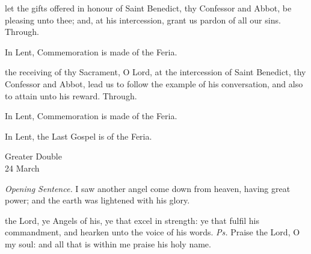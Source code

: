 \secret
{} let the gifts offered in honour of Saint Benedict, thy Confessor and Abbot, be pleasing unto thee; and, at his intercession, grant us pardon of all our sins. Through.
\begin{rubric}
    In Lent, Commemoration is made of the Feria.
\end{rubric}
\postcommunion
{} the receiving of thy Sacrament, O Lord, at the intercession of Saint Benedict, thy Confessor and Abbot, lead us to follow the example of his conversation, and also to attain unto his reward. Through.
\begin{rubric}
    In Lent, Commemoration is made of the Feria.
\end{rubric}
\begin{rubric}
    In Lent, the Last Gospel is of the Feria.
\end{rubric}

\clearpage
{}
\begin{inhead}
    {Greater Double\\
24 March}
\end{inhead}
\par\noindent
\textit{Opening Sentence.} I saw another angel come down from heaven, having great power; and the earth was lightened with his glory.
\par\noindent
{}
\par\noindent
{}
\par\noindent
{}

\introit
{} the Lord, ye Angels of his, ye that excel in strength: ye that fulfil his commandment, and hearken unto the voice of his words. \textit{Ps.} Praise the Lord, O my soul: and all that is within me praise his holy name.

